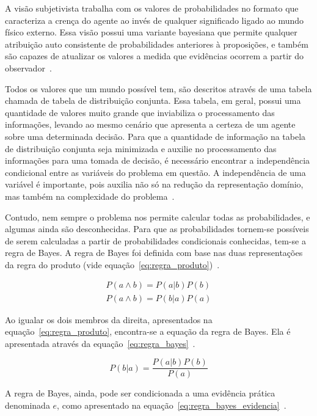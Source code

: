 A visão subjetivista trabalha com os valores de probabilidades no formato que caracteriza a crença do agente ao invés de qualquer significado ligado ao mundo físico externo. Essa visão possui uma variante bayesiana que permite qualquer atribuição auto consistente de probabilidades anteriores à proposições, e também são capazes de atualizar os valores a medida que evidências ocorrem a partir do observador~\cite{Russell:2002}.

Todos os valores que um mundo possível tem, são descritos através de uma tabela chamada de tabela de distribuição conjunta. Essa tabela, em geral, possui uma quantidade de valores muito grande que inviabiliza o processamento das informações, levando ao mesmo cenário que apresenta a certeza de um agente sobre uma determinada decisão. Para que a quantidade de informação na tabela de distribuição conjunta seja minimizada e auxilie no processamento das informações para uma tomada de decisão, é necessário encontrar a independência condicional entre as variáveis do problema em questão. A independência de uma variável é importante, pois auxilia não só na redução da representação domínio, mas também na complexidade do problema~\cite{Russell:2002}.

Contudo, nem sempre o problema nos permite calcular todas as probabilidades, e algumas ainda são desconhecidas. Para que as probabilidades tornem-se possíveis de serem calculadas a partir de probabilidades condicionais conhecidas, tem-se a regra de Bayes. A regra de Bayes foi definida com base nas duas representações da regra do produto (vide equação~\ref{eq:regra_produto})~\cite{Russell:2002}.

\begin{subequations}
    \label{eq:regra_produto}
    \begin{align}
        P(a \land b) = P(a|b)P(b)\\
        P(a \land b) = P(b|a)P(a)
    \end{align}
\end{subequations}

Ao igualar os dois membros da direita, apresentados na equação~\ref{eq:regra_produto}, encontra-se a equação da regra de Bayes. Ela é apresentada através da equação~\ref{eq:regra_bayes}~\cite{Russell:2002}.

\begin{equation}
    \label{eq:regra_bayes}
    P(b|a) = \frac{P(a|b)P(b)}{P(a)}
\end{equation}

A regra de Bayes, ainda, pode ser condicionada a uma evidência prática denominada $e$, como apresentado na equação~\ref{eq:regra_bayes_evidencia}~\cite{Russell:2002}.

